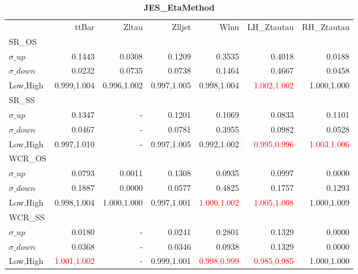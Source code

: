 \documentclass[11pt,oneside,a4paper]{article}
\begin{document}
\begin{table}
\caption{\bf{JES\_EtaMethod}}
\centering
\begin{tabular}{lrrrrrr}
& ttBar & Zltau & Zlljet & Wlnu & LH\_Ztautau & RH\_Ztautau \\

SR\_OS &  &  &  &  &  &  \\
$\sigma\_up$ & 0.1443 & 0.0308 & 0.1209 & 0.3535 & 0.4018 & 0.0188 \\
$\sigma\_down$ & 0.0232 & 0.0735 & 0.0738 & 0.1464 & 0.4667 & 0.0458 \\
Low,High & 0.999,1.004 & 0.996,1.002 & 0.997,1.005 & 0.998,1.004 & \textcolor{red}{1.002,1.002} & 1.000,1.000 \\

\hline
SR\_SS &  &  &  &  &  &  \\
$\sigma\_up$ & 0.1347 & - & 0.1201 & 0.1069 & 0.0833 & 0.1101 \\
$\sigma\_down$ & 0.0467 & - & 0.0781 & 0.3955 & 0.0982 & 0.0528 \\
Low,High & 0.997,1.010 & - & 0.997,1.005 & 0.992,1.002 & \textcolor{red}{0.995,0.996} & \textcolor{red}{1.003,1.006} \\

\hline
WCR\_OS &  &  &  &  &  &  \\
$\sigma\_up$ & 0.0793 & 0.0011 & 0.1308 & 0.0935 & 0.0997 & 0.0000 \\
$\sigma\_down$ & 0.1887 & 0.0000 & 0.0577 & 0.4825 & 0.1757 & 0.1293 \\
Low,High & 0.998,1.004 & 1.000,1.000 & 0.997,1.001 & \textcolor{red}{1.000,1.002} & \textcolor{red}{1.005,1.008} & 1.000,1.009 \\

\hline
WCR\_SS &  &  &  &  &  &  \\
$\sigma\_up$ & 0.0180 & - & 0.0241 & 0.2801 & 0.1329 & 0.0000 \\
$\sigma\_down$ & 0.0368 & - & 0.0346 & 0.0938 & 0.1329 & 0.0000 \\
Low,High & \textcolor{red}{1.001,1.002} & - & 0.999,1.001 & \textcolor{red}{0.998,0.999} & \textcolor{red}{0.985,0.985} & 1.000,1.000 \\

\end{tabular}
\end{table}
\end{document}
